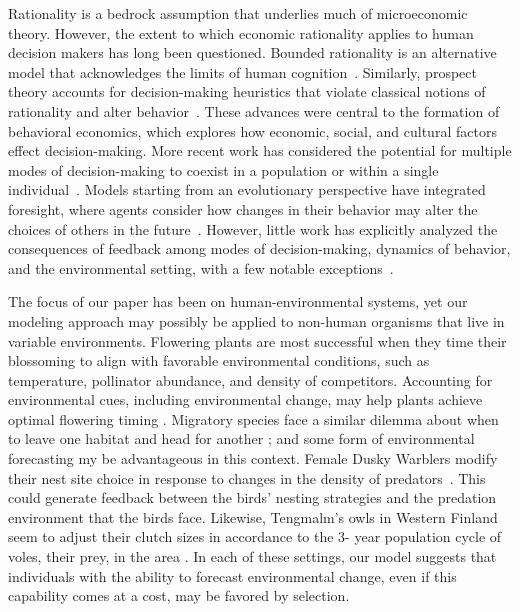 \documentclass{article}
\begin{document}
Rationality is a bedrock assumption that underlies much of microeconomic theory. However, the extent to which economic rationality applies to human decision makers has long been questioned. Bounded rationality is an alternative model that acknowledges the limits of human cognition~\citep{simon1955}. Similarly, prospect theory accounts for decision-making heuristics that violate classical notions of rationality and alter behavior~\citep{tversky1974}. These advances were central to the formation of behavioral economics, which explores how economic, social, and cultural factors effect decision-making. More recent work has considered the potential for multiple modes of decision-making to coexist in a population or within a single individual~\citep{kahneman2011thinking,rand2017}. Models starting from an evolutionary perspective have integrated foresight, where agents consider how changes in their behavior may alter the choices of others in the future~\citep{perry2020foresight,perry2018collective}. However, little work has explicitly analyzed the consequences of feedback among modes of decision-making, dynamics of behavior, and the environmental setting, with a few notable exceptions~\citep{adamson2020resource,Austrup}.     

The focus of our paper has been on human-environmental systems, yet our modeling approach may possibly be applied to non-human organisms that live in variable environments. Flowering plants are most successful when they time their blossoming to align with favorable environmental conditions, such as temperature, pollinator abundance, and density of competitors. Accounting for environmental cues, including environmental change, may help plants achieve optimal flowering timing \citep{vermeulen2015}. Migratory species face a similar dilemma about when to leave one habitat and head for another \citep{johansson2012}; and some form of environmental forecasting my be advantageous in this context. Female Dusky Warblers modify their nest site choice in response to changes in the density of predators~\citep{forstmeier}. This could generate feedback between the birds' nesting strategies and the predation environment that the birds face. Likewise, Tengmalm's owls in Western Finland seem to adjust their clutch sizes in accordance to the 3- year population cycle of voles, their prey, in the area  \citep{korpimaki1991}. In each of these settings, our model suggests that individuals with the ability to forecast environmental change, even if this capability comes at a cost, may be favored by selection.
\end{document}
